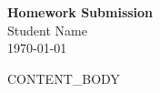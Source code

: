 \documentclass[12pt]{article}
\begin{document}
\begin{center}
    \textbf{\Large Homework Submission} \\
    \vspace{0.2cm}
    Student Name \\
    \today
\end{center}

\vspace{0.5cm}

{{CONTENT_BODY}}
\end{document}

